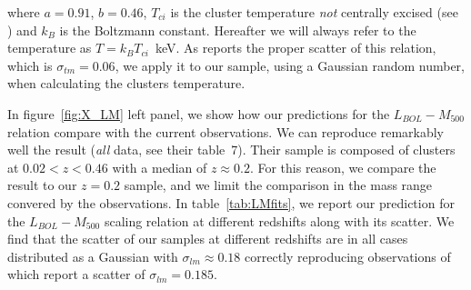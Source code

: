 \documentclass[traditabstract]{aa}
\begin{document}
where $a=0.91$, $b=0.46$, $T_{ci}$ is the cluster temperature \emph{not} centrally excised (see \citealp{2010MNRAS.406.1773M}) and $k_{B}$ is the Boltzmann constant. Hereafter we will always refer to the temperature as $T = k_{B}T_{ci}$~keV. As \cite{2010MNRAS.406.1773M} reports the proper scatter of this relation, which is $\sigma_{tm} = 0.06$, we apply it to our sample, using a Gaussian random number, when calculating the clusters temperature. 

In figure~\ref{fig:X_LM} left panel, we show how our predictions for the $L_{BOL}-M_{500}$ relation compare with the current observations. We can reproduce remarkably well the \cite{2010MNRAS.406.1773M} result (\emph{all} data, see their table~7). Their sample is composed of clusters at $0.02<z<0.46$ with a median of $z \approx 0.2$. For this reason, we compare the \cite{2010MNRAS.406.1773M} result to our $z=0.2$ sample, and we limit the comparison in the mass range convered by the observations.
In table~\ref{tab:LMfits}, we report our prediction for the $L_{BOL}-M_{500}$ scaling relation at different redshifts along with its scatter. We find that the scatter of our samples at different redshifts are in all cases distributed as a Gaussian with $\sigma_{lm} \approx 0.18$ correctly reproducing observations of \cite{2010MNRAS.406.1773M} which report a scatter of $\sigma_{lm} = 0.185$.
\end{document}
